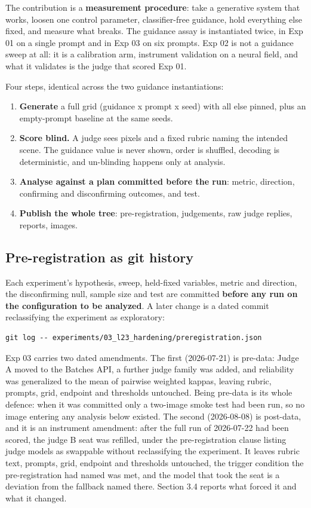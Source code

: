 \documentclass[11pt]{article}
\providecommand{\tightlist}{\setlength{\itemsep}{0pt}\setlength{\parskip}{0pt}}
\begin{document}
The contribution is a \textbf{measurement procedure}: take a generative system
that works, loosen one control parameter, classifier-free guidance, hold
everything else fixed, and measure what breaks. The guidance assay is
instantiated twice, in Exp 01 on a single prompt and in Exp 03 on six prompts.
Exp 02 is not a guidance sweep at all: it is a calibration arm, instrument
validation on a neural field, and what it validates is the judge that scored Exp
01.

Four steps, identical across the two guidance instantiations:

\begin{enumerate}
\def\labelenumi{\arabic{enumi}.}
\tightlist
\item
  \textbf{Generate} a full grid (guidance x prompt x seed) with all else pinned,
  plus an empty-prompt baseline at the same seeds.
\item
  \textbf{Score blind.} A judge sees pixels and a fixed rubric naming the
  intended scene. The guidance value is never shown, order is shuffled, decoding
  is deterministic, and un-blinding happens only at analysis.
\item
  \textbf{Analyse against a plan committed before the run}: metric, direction,
  confirming and disconfirming outcomes, and test.
\item
  \textbf{Publish the whole tree}: pre-registration, judgements, raw judge
  replies, reports, images.
\end{enumerate}

\subsection{Pre-registration as git
history}\label{pre-registration-as-git-history}

Each experiment's hypothesis, sweep, held-fixed variables, metric and direction,
the disconfirming null, sample size and test are committed \textbf{before any
run on the configuration to be analyzed}. A later change is a dated commit
reclassifying the experiment as exploratory:

\begin{verbatim}
git log -- experiments/03_l23_hardening/preregistration.json
\end{verbatim}

Exp 03 carries two dated amendments. The first (2026-07-21) is pre-data: Judge A
moved to the Batches API, a further judge family was added, and reliability was
generalized to the mean of pairwise weighted kappas, leaving rubric, prompts,
grid, endpoint and thresholds untouched. Being pre-data is its whole defence:
when it was committed only a two-image smoke test had been run, so no image
entering any analysis below existed. The second (2026-08-08) is post-data, and
it is an instrument amendment: after the full run of 2026-07-22 had been scored,
the judge B seat was refilled, under the pre-registration clause listing judge
models as swappable without reclassifying the experiment. It leaves rubric text,
prompts, grid, endpoint and thresholds untouched, the trigger condition the
pre-registration had named was met, and the model that took the seat is a
deviation from the fallback named there. Section 3.4 reports what forced it and
what it changed.
\end{document}
